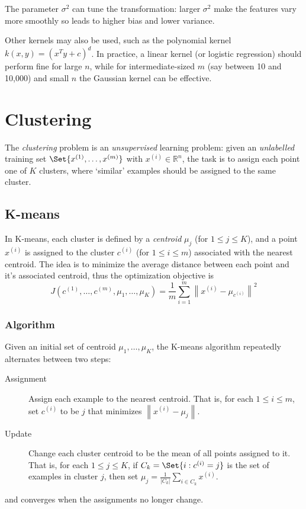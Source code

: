 \documentclass[a4paper,12pt]{article}
\theoremstyle{definition}
\newcommand{\R}{\mathbb{R}}
\newcommand{\norm}[1]{\left\lVert#1\right\rVert}
\begin{document}
The parameter $\sigma^2$ can tune the transformation: larger $\sigma^2$ make the features vary more smoothly so leads to higher bias and lower variance.

Other kernels may also be used, such as the polynomial kernel $k(x, y) = (x^T y + c)^d$. In practice, a linear kernel (or logistic regression) should perform fine for large $n$, while for intermediate-sized $m$ (say between 10 and 10,000) and small $n$ the Gaussian kernel can be effective.

\section{Clustering}
The \emph{clustering} problem is an \emph{unsupervised} learning problem: given an \emph{unlabelled} training set $\Set{x^{(1)}, \ldots, x^{(m)}}$ with $x^{(i)} \in \R^n$, the task is to assign each point one of $K$ clusters, where `similar' examples should be assigned to the same cluster.

\subsection{K-means}
In {K-means}, each cluster is defined by a \emph{centroid} $\mu_j$ (for $1 \le j \le K$), and a point $x^{(i)}$ is assigned to the cluster $c^{(i)}$ (for $1 \le i \le m$) associated with the nearest centroid. The idea is to minimize the average distance between each point and it's associated centroid, thus the optimization objective is
\[
J(c^{(1)}, \ldots, c^{(m)}, \mu_1, \ldots, \mu_K) = \frac{1}{m} \sum_{i=1}^{m} \norm{x^{(i)} - \mu_{c^{(i)}}}^2
\]

\subsubsection{Algorithm}
Given an initial set of centroid $\mu_1, \ldots, \mu_K$, the K-means algorithm repeatedly alternates between two steps:
\begin{description}
\item[Assignment] Assign each example to the nearest centroid. That is, for each $1 \le i \le m$, set $c^{(i)}$ to be $j$ that minimizes $\norm{x^{(i)} - \mu_j}$.
\item[Update] Change each cluster centroid to be the mean of all points assigned to it. That is, for each $1 \le j \le K$, if $C_k = \Set{i : c^{(i)} = j}$ is the set of examples in cluster $j$, then set $\mu_j = \frac{1}{|C_k|} \sum_{i \in C_k} x^{(i)}$.
\end{description}
and converges when the assignments no longer change.
\end{document}
